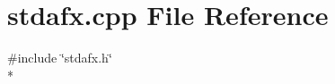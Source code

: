 \section{stdafx.\+cpp File Reference}
\label{stdafx_8cpp}
{\ttfamily \#include \char`\"{}stdafx.\+h\char`\"{}}\\*
